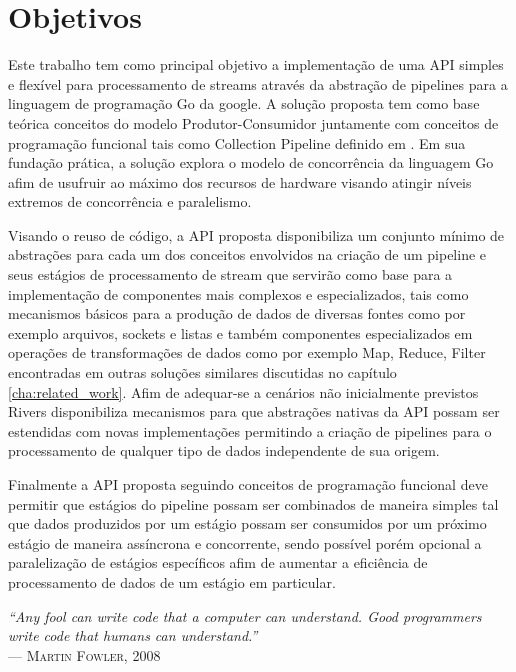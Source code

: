\section{Objetivos}
\label{sec:objectives}

Este trabalho tem como principal objetivo a implementação de uma API  simples e flexível para processamento de streams através da abstração de pipelines para a linguagem de programação Go da google. A solução proposta tem como base teórica conceitos do modelo Produtor-Consumidor \cite{paper:david_kocher:producer_consumer} juntamente com conceitos de programação funcional tais como Collection Pipeline definido em \cite{article:martin_fowler:collection_pipeline}. Em sua fundação prática, a solução explora o modelo de concorrência da linguagem Go afim de usufruir ao máximo dos recursos de hardware visando atingir níveis extremos de concorrência e paralelismo.

Visando o reuso de código, a API proposta disponibiliza um conjunto mínimo de abstrações para cada um dos conceitos envolvidos na criação de um pipeline e seus estágios de processamento de stream que servirão como base para a implementação de componentes mais complexos e especializados, tais como mecanismos básicos para a produção de dados de diversas fontes como por exemplo arquivos, sockets e listas e também componentes especializados em operações de transformações de dados como por exemplo Map, Reduce, Filter encontradas em outras soluções similares discutidas no capítulo \ref{cha:related_work}. Afim de adequar-se a cenários não inicialmente previstos Rivers disponibiliza mecanismos para que abstrações nativas da API possam ser estendidas com novas implementações permitindo a criação de pipelines para o processamento de qualquer tipo de dados independente de sua origem.

Finalmente a API proposta seguindo conceitos de programação funcional deve permitir que estágios do pipeline possam ser combinados de maneira simples tal que dados produzidos por um estágio possam ser consumidos por um próximo estágio de maneira assíncrona e concorrente, sendo possível porém opcional a paralelização de estágios específicos afim de aumentar a eficiência de processamento de dados de um estágio em particular.

\begin{flushright}
\mbox{}\vfill
{\sffamily\itshape
``Any fool can write code that a computer can understand. Good programmers write code that humans can understand.''\\}
--- \textsc{Martin Fowler, 2008}
\end{flushright}

